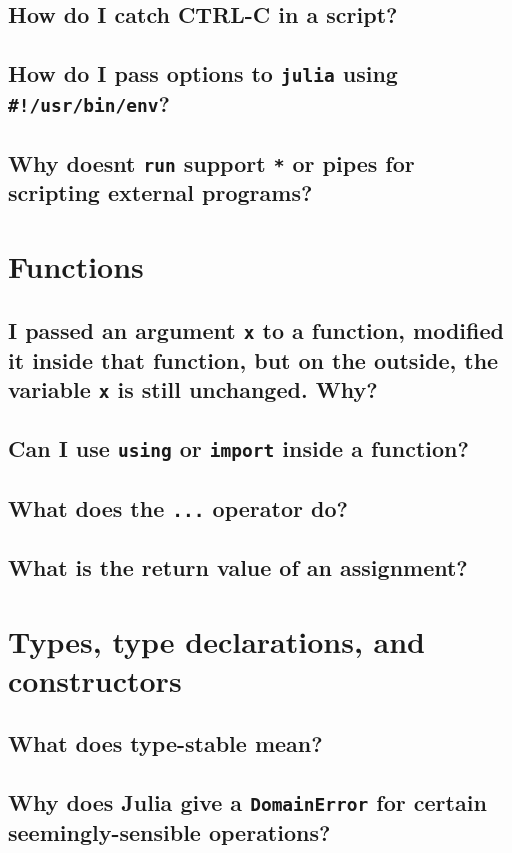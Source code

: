     \subsection{How do I catch CTRL-C in a script?}
    \subsection{How do I pass options to \texttt{julia} using \texttt{\#!/usr/bin/env}?}
    \subsection{Why doesn{\textquotesingle}t \texttt{run} support \texttt{*} or pipes for scripting external programs?}
    \section{Functions}
    \subsection{I passed an argument \texttt{x} to a function, modified it inside that function, but on the outside, the variable \texttt{x} is still unchanged. Why?}
    \subsection{Can I use \texttt{using} or \texttt{import} inside a function?}
    \subsection{What does the \texttt{...} operator do?}
    \subsection{What is the return value of an assignment?}
    \section{Types, type declarations, and constructors}
    \subsection{What does {\textquotedbl}type-stable{\textquotedbl} mean?}
    \subsection{Why does Julia give a \texttt{DomainError} for certain seemingly-sensible operations?}
